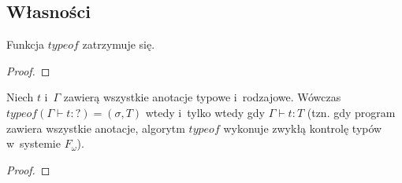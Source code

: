 \documentclass[11pt,leqno]{article}
\begin{document}
\subsection{Własności}

\begin{twierdzenie}
Funkcja $typeof$ zatrzymuje się.
\end{twierdzenie}
\begin{proof}
\end{proof}

\begin{twierdzenie}
Niech $t$ i~$\Gamma$ zawierą wszystkie anotacje typowe i~rodzajowe. Wówczas $typeof(\Gamma \vdash t : ?) = (\sigma, T)$ wtedy 
i~tylko wtedy gdy $\Gamma \vdash t : T$ (tzn. gdy program zawiera wszystkie anotacje, algorytm $typeof$ wykonuje zwykłą 
kontrolę typów w~systemie $F_\omega$).
\end{twierdzenie}
\begin{proof}
\end{proof}
\end{document}
